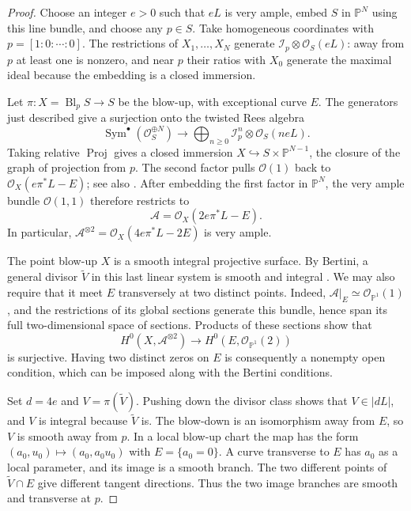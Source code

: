 \begin{proof}
Choose an integer $e>0$ such that $eL$ is very ample, embed $S$ in $\mathbb{P}^N$ using this line bundle, and choose any $p\in S$.  Take homogeneous coordinates with $p=[1:0:\cdots:0]$.  The restrictions of $X_1,\ldots,X_N$ generate $\mathcal{I}_p\otimes\mathcal{O}_S(eL)$: away from $p$ at least one is nonzero, and near $p$ their ratios with $X_0$ generate the maximal ideal because the embedding is a closed immersion.

Let $\pi:X=\operatorname{Bl}_pS\to S$ be the blow-up, with exceptional curve $E$.  The generators just described give a surjection onto the twisted Rees algebra
\[
 \operatorname{Sym}^{\bullet}(\mathcal{O}_S^{\oplus N})
 \longrightarrow
 \bigoplus_{n\ge0}\mathcal{I}_p^n\otimes\mathcal{O}_S(neL).
\]
Taking relative $\operatorname{Proj}$ gives a closed immersion $X\hookrightarrow S\times\mathbb{P}^{N-1}$, the closure of the graph of projection from $p$. The second factor pulls $\mathcal{O}(1)$ back to $\mathcal{O}_X(e\pi^*L-E)$; see also \cite[Tag \href{https://stacks.math.columbia.edu/tag/01OF}{01OF}]{Stacks}. After embedding the first factor in $\mathbb{P}^N$, the very ample bundle $\mathcal{O}(1,1)$ therefore restricts to
\[
 \mathcal{A}=\mathcal{O}_X(2e\pi^*L-E).
\]
In particular, $\mathcal{A}^{\otimes2}=\mathcal{O}_X(4e\pi^*L-2E)$ is very ample.

The point blow-up $X$ is a smooth integral projective surface.  By Bertini, a general divisor $\widetilde V$ in this last linear system is smooth and integral \cite[Tags \href{https://stacks.math.columbia.edu/tag/0FD6}{0FD6} and \href{https://stacks.math.columbia.edu/tag/0G4F}{0G4F}]{Stacks}.  We may also require that it meet $E$ transversely at two distinct points.  Indeed, $\mathcal{A}|_E\simeq\mathcal{O}_{\mathbb{P}^1}(1)$, and the restrictions of its global sections generate this bundle, hence span its full two-dimensional space of sections.  Products of these sections show that
\[
 H^0(X,\mathcal{A}^{\otimes2})
 \longrightarrow H^0(E,\mathcal{O}_{\mathbb{P}^1}(2))
\]
is surjective.  Having two distinct zeros on $E$ is consequently a nonempty open condition, which can be imposed along with the Bertini conditions.

Set $d=4e$ and $V=\pi(\widetilde V)$.  Pushing down the divisor class shows that $V\in|dL|$, and $V$ is integral because $\widetilde V$ is. The blow-down is an isomorphism away from $E$, so $V$ is smooth away from $p$.  In a local blow-up chart the map has the form $(a_0,u_0)\mapsto(a_0,a_0u_0)$ with $E=\{a_0=0\}$. A curve transverse to $E$ has $a_0$ as a local parameter, and its image is a smooth branch.  The two different points of $\widetilde V\cap E$ give different tangent directions.  Thus the two image branches are smooth and transverse at $p$.
\end{proof}


